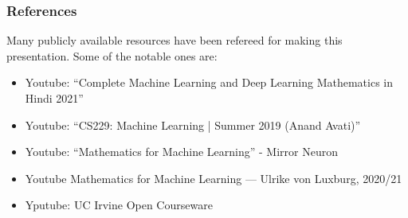 \begin{frame}\frametitle{References}
Many publicly available resources have been refereed for making this presentation. Some of the notable ones are:
\small
\begin{itemize}
\item Youtube: ``Complete Machine Learning and Deep Learning Mathematics in Hindi 2021''
\item Youtube: ``CS229: Machine Learning | Summer 2019 (Anand Avati)''
\item Youtube: ``Mathematics for Machine Learning'' - Mirror Neuron
\item Youtube Mathematics for Machine Learning — Ulrike von Luxburg, 2020/21
\item Yputube: UC Irvine Open Courseware
\end{itemize}
\end{frame}

